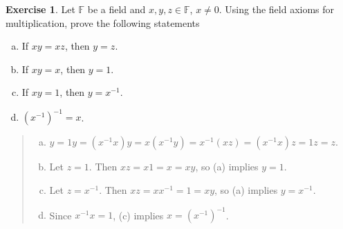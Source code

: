 \documentclass{article}
\theoremstyle{definition}
\newtheorem{exercise}[theorem]{Exercise}
\begin{document}
\begin{exercise}
    Let \(\mathbb{F}\) be a field and \(x,y,z\in\mathbb{F}\), \(x\neq0\). Using the field axioms for multiplication, prove the following statements
    \begin{enumerate}[(a)]
        \item If \(xy=xz\), then \(y=z\).
        \item If \(xy=x\), then \(y=1\).
        \item If \(xy=1\), then \(y=x^{-1}\).
        \item \((x^{-1})^{-1}=x\).
    \end{enumerate}
\end{exercise}
\begin{quote}
    \begin{enumerate}[(a)]
        \item \(y=1y=(x^{-1}x)y=x(x^{-1}y)=x^{-1}(xz)=(x^{-1}x)z=1z=z.\)
        \item Let \(z=1\). Then \(xz=x1=x=xy\), so (a) implies \(y=1\).
        \item Let \(z=x^{-1}\). Then \(xz=xx^{-1}=1=xy\), so
        (a) implies \(y=x^{-1}\).
        \item Since \(x^{-1}x=1\), (c) implies \(x=(x^{-1})^{-1}\).       
    \end{enumerate}
\end{quote}
\end{document}
